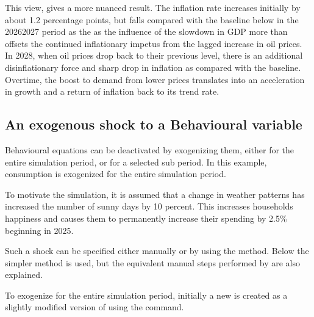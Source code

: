 \documentclass[letterpaper,10pt,english]{jupyterBook}
\begin{document}
\sphinxAtStartPar
This view, gives a more nuanced result.  The inflation rate increases initially by about 1.2 percentage points, but falls compared with the baseline below in the 2026\sphinxhyphen{}2027 period as the as the influence of the slowdown in GDP more than offsets the continued inflationary impetus from the lagged increase in oil prices. In 2028, when oil prices drop back to their previous level, there is an additional dis\sphinxhyphen{}inflationary force and sharp drop in inflation as compared with the baseline. Overtime, the boost to demand from lower prices translates into an acceleration in growth and a return of inflation back to its trend rate.


\subsection{An exogenous shock to a Behavioural variable}
\label{\detokenize{content/06_WBModels/ScenarioAnalysis:an-exogenous-shock-to-a-behavioural-variable}}
\sphinxAtStartPar
Behavioural equations can be de\sphinxhyphen{}activated by exogenizing them, either for the entire simulation period, or for a selected sub period.  In this example, consumption is exogenized for the entire simulation period.

\sphinxAtStartPar
To motivate the simulation, it is assumed that a change in weather patterns has increased the number of sunny days by 10 percent. This increases households happiness and causes them to permanently increase their spending by 2.5\% beginning in 2025.

\sphinxAtStartPar
Such a shock can be specified either manually or by using the method. Below the simpler  method is used, but the equivalent manual steps performed by  are also explained.

\sphinxAtStartPar
To exogenize  for the entire simulation period, initially a new   is created as a slightly modified version of   using the  command.

\sphinxAtStartPar
{}
\end{document}
